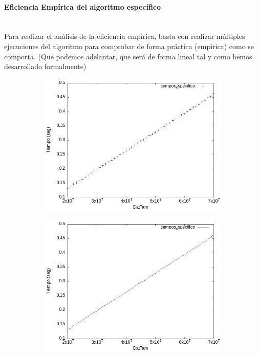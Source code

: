 \documentclass{article}
\newcommand{\myparagraph}[1]{\paragraph{#1}\mbox{}\\}
\begin{document}
\myparagraph{Eficiencia Empírica del algoritmo específico}
Para realizar el análisis de la eficiencia empírica, basta con realizar múltiples ejecuciones del algoritmo para comprobar de forma práctica (empírica) como se comporta. (Que podemos adelantar, que será de forma lineal tal y como hemos desarrollado formalmente)


\begin{figure}[H]
	\centering
	\begin{subfigure}{0.4\textwidth}
            \centering
            \includegraphics[scale = 0.40]{P1/tiempos_especifico_Puntos.png}
        \end{subfigure}	\hfill
	\begin{subfigure}{0.4\textwidth}
            \centering
            \includegraphics[scale = 0.40]{P1/tiempos_especifico_Lineas.png}
        \end{subfigure}
    \end{figure}
\end{document}
